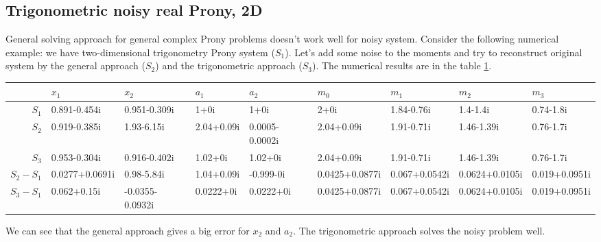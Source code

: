 \subsection{Trigonometric noisy real Prony, 2D}

General solving approach for general complex Prony problems doesn't work well for noisy system. Consider the following numerical example: we have two-dimensional trigonometry Prony system ($S_1$). Let's add some noise to the moments and try to reconstruct original system by the general approach ($S_2$) and the trigonometric approach ($S_3$).
The numerical results are in the table \ref{tbl:noisy}.

\begin{table}
\label{tbl:noisy}
\centering
\begin{tabular}{rllllllll}
  \hline
 & $x_1$ & $x_2$ & $a_1$ & $a_2$ & $m_0$ & $m_1$ & $m_2$ & $m_3$ \\ 
  \hline
  $S_1$ & 0.891-0.454i & 0.951-0.309i & 1+0i & 1+0i & 2+0i & 1.84-0.76i & 1.4-1.4i & 0.74-1.8i \\ 
  $S_2$ & 0.919-0.385i & 1.93-6.15i & 2.04+0.09i & 0.0005-0.0002i & 2.04+0.09i & 1.91-0.71i & 1.46-1.39i & 0.76-1.7i \\ 
  $S_3$ & 0.953-0.304i & 0.916-0.402i & 1.02+0i & 1.02+0i & 2.04+0.09i & 1.91-0.71i & 1.46-1.39i & 0.76-1.7i \\ 
  $S_2-S_1$ & 0.0277+0.0691i & 0.98-5.84i & 1.04+0.09i & -0.999-0i & 0.0425+0.0877i & 0.067+0.0542i & 0.0624+0.0105i & 0.019+0.0951i \\ 
  $S_3-S_1$ & 0.062+0.15i & -0.0355-0.0932i & 0.0222+0i & 0.0222+0i & 0.0425+0.0877i & 0.067+0.0542i & 0.0624+0.0105i & 0.019+0.0951i \\ 
   \hline
\end{tabular}
\end{table}

\midskip
  
We can see that the general approach gives a big error for $x_2$ and $a_2$. The trigonometric approach solves the noisy problem well.
  